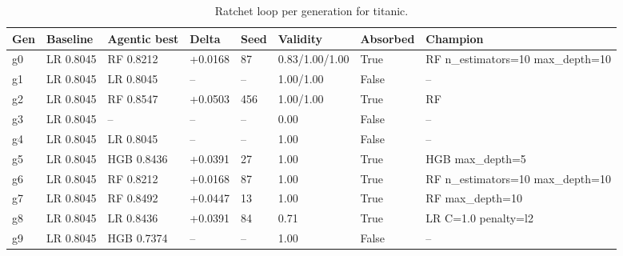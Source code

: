 \begin{table}[H]
\centering\small
\caption{Ratchet loop per generation for titanic.}
\label{tab:ratchet-generations-ratchet-ledger-titanic}
\begin{tabular}{llllllll}
\toprule
Gen & Baseline & Agentic best & Delta & Seed & Validity & Absorbed & Champion \\
\midrule
g0 & LR 0.8045 & RF 0.8212 & +0.0168 & 87 & 0.83/1.00/1.00 & True & RF n\_estimators=10 max\_depth=10 \\
g1 & LR 0.8045 & LR 0.8045 & -- & -- & 1.00/1.00 & False & -- \\
g2 & LR 0.8045 & RF 0.8547 & +0.0503 & 456 & 1.00/1.00 & True & RF \\
g3 & LR 0.8045 & -- & -- & -- & 0.00 & False & -- \\
g4 & LR 0.8045 & LR 0.8045 & -- & -- & 1.00 & False & -- \\
g5 & LR 0.8045 & HGB 0.8436 & +0.0391 & 27 & 1.00 & True & HGB max\_depth=5 \\
g6 & LR 0.8045 & RF 0.8212 & +0.0168 & 87 & 1.00 & True & RF n\_estimators=10 max\_depth=10 \\
g7 & LR 0.8045 & RF 0.8492 & +0.0447 & 13 & 1.00 & True & RF max\_depth=10 \\
g8 & LR 0.8045 & LR 0.8436 & +0.0391 & 84 & 0.71 & True & LR C=1.0 penalty=l2 \\
g9 & LR 0.8045 & HGB 0.7374 & -- & -- & 1.00 & False & -- \\
\bottomrule
\end{tabular}
\end{table}
